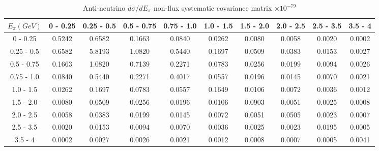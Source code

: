 \documentclass[aps,prl,twocolumn,showpacs,superscriptaddress,nofootinbib]{revtex4}
\begin{document}
\begingroup
\squeezetable
\begin{table}[h]
\tabcolsep=0.11cm
\begin{tabular}{c|ccccccccc}
$E_{\pi}(GeV)$ & 0 - 0.25 & 0.25 - 0.5 & 0.5 - 0.75 & 0.75 - 1.0 & 1.0 - 1.5 & 1.5 - 2.0 & 2.0 - 2.5 & 2.5 - 3.5 & 3.5 - 4 \\
\hline
0 - 0.25& 0.5242	&0.6582	&0.1663	&0.0840	&0.0262	&0.0080	&0.0058	&0.0020	&0.0002	\\
0.25 - 0.5 &0.6582	&5.8193	&1.0820	&0.5440	&0.1697	&0.0509	&0.0383	&0.0153	&0.0027	\\
0.5 - 0.75 &0.1663	&1.0820	&0.7139	&0.2271	&0.0783	&0.0256	&0.0199	&0.0094	&0.0026	\\
0.75 - 1.0 &0.0840	&0.5440	&0.2271	&0.4017	&0.0557	&0.0196	&0.0145	&0.0070	&0.0021	\\
1.0 - 1.5 &0.0262	&0.1697	&0.0783	&0.0557	&0.1649	&0.0106	&0.0072	&0.0036	&0.0012	\\
1.5 - 2.0 &0.0080	&0.0509	&0.0256	&0.0196	&0.0106	&0.0903	&0.0051	&0.0025	&0.0008	\\
2.0 - 2.5 &0.0058	&0.0383	&0.0199	&0.0145	&0.0072	&0.0051	&0.0505	&0.0023	&0.0007	\\
2.5 - 3.5 &0.0020	&0.0153	&0.0094	&0.0070	&0.0036	&0.0025	&0.0023	&0.0195	&0.0005	\\
3.5 - 4 &0.0002	&0.0027	&0.0026	&0.0021	&0.0012	&0.0008	&0.0007	&0.0005	&0.0041\\	
 
\end{tabular}
\caption{Anti-neutrino $d\sigma/dE_\pi$ non-flux systematic covariance matrix  $\times 10^{-79}$ }
\label{tab:epiB-nonflux}
\end{table}
\endgroup
\end{document}
